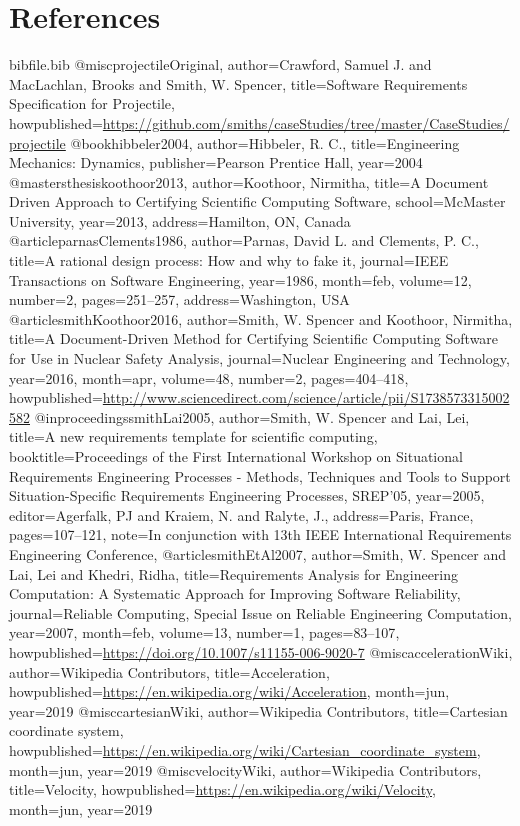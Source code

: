 \documentclass[12pt]{article}
\begin{document}
\section{References}
\label{Sec:References}
\begin{filecontents*}{bibfile.bib}
@misc{projectileOriginal,
author={Crawford, Samuel J. and MacLachlan, Brooks and Smith, W. Spencer},
title={Software Requirements Specification for Projectile},
howpublished={\url{https://github.com/smiths/caseStudies/tree/master/CaseStudies/projectile}}}
@book{hibbeler2004,
author={Hibbeler, R. C.},
title={Engineering Mechanics: Dynamics},
publisher={Pearson Prentice Hall},
year={2004}}
@mastersthesis{koothoor2013,
author={Koothoor, Nirmitha},
title={A Document Driven Approach to Certifying Scientific Computing Software},
school={McMaster University},
year={2013},
address={Hamilton, ON, Canada}}
@article{parnasClements1986,
author={Parnas, David L. and Clements, P. C.},
title={A rational design process: How and why to fake it},
journal={IEEE Transactions on Software Engineering},
year={1986},
month=feb,
volume={12},
number={2},
pages={251--257},
address={Washington, USA}}
@article{smithKoothoor2016,
author={Smith, W. Spencer and Koothoor, Nirmitha},
title={A Document-Driven Method for Certifying Scientific Computing Software for Use in Nuclear Safety Analysis},
journal={Nuclear Engineering and Technology},
year={2016},
month=apr,
volume={48},
number={2},
pages={404--418},
howpublished={\url{http://www.sciencedirect.com/science/article/pii/S1738573315002582}}}
@inproceedings{smithLai2005,
author={Smith, W. Spencer and Lai, Lei},
title={A new requirements template for scientific computing},
booktitle={Proceedings of the First International Workshop on Situational Requirements Engineering Processes - Methods, Techniques and Tools to Support Situation-Specific Requirements Engineering Processes, SREP'05},
year={2005},
editor={Agerfalk, PJ and Kraiem, N. and Ralyte, J.},
address={Paris, France},
pages={107--121},
note={In conjunction with 13th IEEE International Requirements Engineering Conference,}}
@article{smithEtAl2007,
author={Smith, W. Spencer and Lai, Lei and Khedri, Ridha},
title={Requirements Analysis for Engineering Computation: A Systematic Approach for Improving Software Reliability},
journal={Reliable Computing, Special Issue on Reliable Engineering Computation},
year={2007},
month=feb,
volume={13},
number={1},
pages={83--107},
howpublished={\url{https://doi.org/10.1007/s11155-006-9020-7}}}
@misc{accelerationWiki,
author={Wikipedia Contributors},
title={Acceleration},
howpublished={\url{https://en.wikipedia.org/wiki/Acceleration}},
month=jun,
year={2019}}
@misc{cartesianWiki,
author={Wikipedia Contributors},
title={Cartesian coordinate system},
howpublished={\url{https://en.wikipedia.org/wiki/Cartesian\_coordinate\_system}},
month=jun,
year={2019}}
@misc{velocityWiki,
author={Wikipedia Contributors},
title={Velocity},
howpublished={\url{https://en.wikipedia.org/wiki/Velocity}},
month=jun,
year={2019}}
\end{filecontents*}
\nocite{*}
\printbibliography[heading=none]
\end{document}
